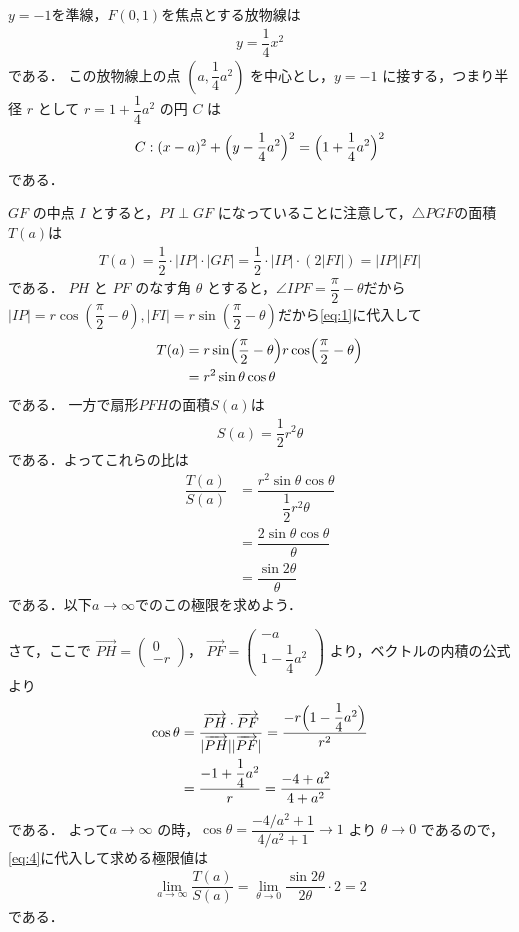 \documentclass[../../main.tex]{subfiles}
\begin{document}
$y=-1$を準線，$F(0,1)$を焦点とする放物線は
\begin{align}
  y = \dfrac{1}{4} x^2
\end{align}
である．
この放物線上の点 $(a, \dfrac{1}{4} a^2)$ を中心とし，$y = -1$ に接する，つまり半径 $r$ として $r = 1 + \dfrac{1}{4} a^2$ の円 $C$ は
\begin{align}
  C : (x - a)^2 + \Bigl(y - \dfrac{1}{4} a^2\Bigr)^2 = \Bigl(1 + \dfrac{1}{4} a^2\Bigr)^2
\end{align}
である．

$GF$ の中点 $I$ とすると，$PI \perp GF$ になっていることに注意して，$\triangle PGF$の面積$T(a)$は
\begin{align}
  T(a) = \dfrac{1}{2} \cdot |IP| \cdot |GF| = \dfrac{1}{2} \cdot |IP| \cdot (2 |FI|) = |IP||FI| \label{eq:1}
\end{align}
である．
$PH$ と $PF$ のなす角 $\theta$ とすると，$\angle IPF = \dfrac{\pi}{2} - \theta$だから$|IP|=r\cos\left(\dfrac{\pi}{2} - \theta\right), |FI|=r\sin\left(\dfrac{\pi}{2} - \theta\right)$だから\cref{eq:1}に代入して
\begin{align}
  T(a)
  &= r \sin\Bigl(\dfrac{\pi}{2} - \theta\Bigr) r \cos\Bigl(\dfrac{\pi}{2} - \theta\Bigr) \\
  &= r^2 \sin\theta \cos\theta \label{eq:2}
\end{align}
である．
一方で扇形$PFH$の面積$S(a)$は
\begin{align}
  S(a) = \dfrac{1}{2} r^2 \theta \label{eq:3}
\end{align}
である．よってこれらの比は
\begin{align}
  \dfrac{T(a)}{S(a)}
  &= \dfrac{r^2 \sin\theta \cos\theta}{\dfrac{1}{2} r^2 \theta} \\
  &= \dfrac{2 \sin\theta \cos\theta}{\theta} \\
  &= \dfrac{\sin 2\theta}{\theta}\label{eq:4}
\end{align}
である．以下$a\to\infty$でのこの極限を求めよう．

さて，ここで
$\overrightarrow{PH} =
\begin{pmatrix} 0 \\ -r
\end{pmatrix}$， $\overrightarrow{PF} =
\begin{pmatrix} -a \\ 1 - \dfrac{1}{4} a^2
\end{pmatrix}$
より，ベクトルの内積の公式より
\begin{align}
  \cos\theta
  &= \dfrac{\overrightarrow{PH} \cdot \overrightarrow{PF}}{|\overrightarrow{PH}| |\overrightarrow{PF}|} = \dfrac{-r \Bigl(1 - \dfrac{1}{4} a^2\Bigr)}{r^2} \\
  &= \dfrac{-1 + \dfrac{1}{4} a^2}{r} = \dfrac{-4 + a^2}{4 + a^2} \label{eq:5}
\end{align}
である．
よって$a \to \infty$ の時，$\cos\theta = \dfrac{-4/a^2 + 1}{4/a^2 + 1} \to 1$ より $\theta \to 0$ であるので，\cref{eq:4}に代入して求める極限値は
\begin{align}
  \lim_{a\to\infty}\dfrac{T(a)}{S(a)}
  = \lim_{\theta\to 0}\dfrac{\sin 2\theta}{2\theta} \cdot 2
  =  2
\end{align}
である．
\end{document}
